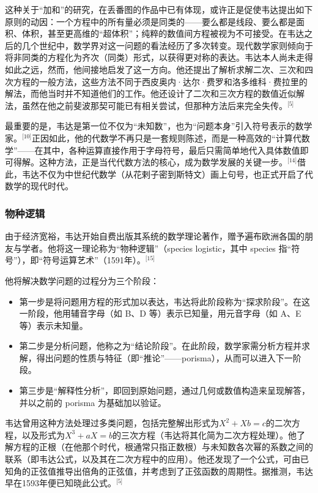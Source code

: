 这种关于“加和”的研究，在丢番图的作品中已有体现，或许正是促使韦达提出如下原则的动因：一个方程中的所有量必须是同类的——要么都是线段、要么都是面积、体积，甚至更高维的“超体积”；纯粹的数值间方程被视为不可接受。在韦达之后的几个世纪中，数学界对这一问题的看法经历了多次转变。现代数学家则倾向于将非同类的方程化为齐次（同类）形式，以获得更对称的表达。韦达本人尚未走得如此之远，然而，他间接地启发了这一方向。他还提出了解析求解二次、三次和四次方程的一般方法，这些方法不同于西皮奥内·达尔·费罗和洛多维科·费拉里的解法，而他当时并不知道他们的工作。他还设计了二次和三次方程的数值近似解法，虽然在他之前斐波那契可能已有相关尝试，但那种方法后来完全失传。\(^\text{[5]}\)

最重要的是，韦达是第一位不仅为“未知数”，也为“问题本身”引入符号表示的数学家。\(^\text{[10]}\)正因如此，他的代数学不再只是一套规则陈述，而是一种高效的“计算代数学”——在其中，各种运算直接作用于字母符号，最后只需简单地代入具体数值即可得解。这种方法，正是当代代数方法的核心，成为数学发展的关键一步。\(^\text{[14]}\)借此，韦达不仅为中世纪代数学（从花剌子密到斯特文）画上句号，也正式开启了代数学的现代时代。
\subsubsection{物种逻辑}
由于经济宽裕，韦达开始自费出版其系统的数学理论著作，赠予遍布欧洲各国的朋友与学者。他将这一理论称为“物种逻辑”（species logistic，其中 species 指“符号”），即“符号运算艺术”（1591年）。\(^\text{[15]}\)

他将解决数学问题的过程分为三个阶段：

\begin{itemize}
\item 第一步是将问题用方程的形式加以表达，韦达将此阶段称为“探求阶段”。在这一阶段，他用辅音字母（如 B、D 等）表示已知量，用元音字母（如 A、E 等）表示未知量。
\item 第二步是分析问题，他称之为“结论阶段”。在此阶段，数学家需分析方程并求解，得出问题的性质与特征（即“推论”——porisma），从而可以进入下一阶段。
\item 第三步是“解释性分析”，即回到原始问题，通过几何或数值构造来呈现解答，并以之前的 porisma 为基础加以验证。
\end{itemize}

韦达曾用这种方法处理过多类问题，包括完整解出形式为$X^2 + Xb = c$的二次方程，以及形式为$X^3 + aX = b$的三次方程（韦达将其化简为二次方程处理）。他了解方程的正根（在他那个时代，根通常只指正数根）与未知数各次幂的系数之间的联系（即韦达公式，以及其在二次方程中的应用）。他还发现了一个公式，可由已知角的正弦值推导出倍角的正弦值，并考虑到了正弦函数的周期性。据推测，韦达早在1593年便已知晓此公式。\(^\text{[5]}\)
